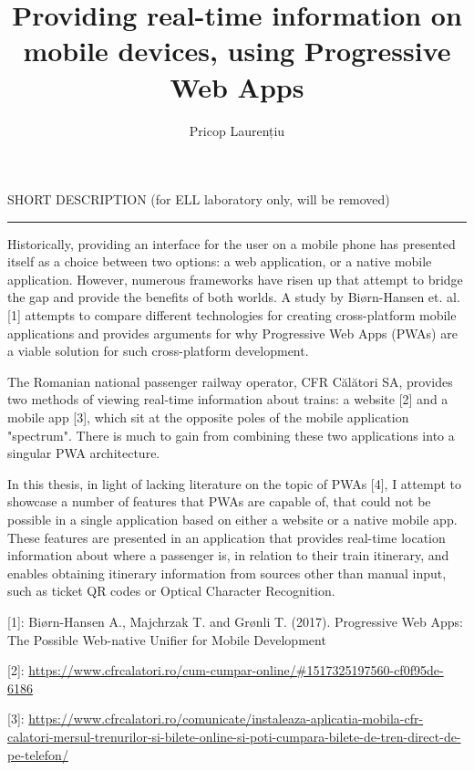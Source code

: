 \documentclass[12pt]{report}
\begin{document}
\title{Providing real-time information on mobile devices, using Progressive Web Apps}
\author{Pricop Laurențiu}
				
\maketitle

\cleardoublepage
SHORT DESCRIPTION (for ELL laboratory only, will be removed)
\vspace{0.5cm}
\hrule
\vspace{0.5cm}

Historically, providing an interface for the user on a mobile phone has presented itself as a choice between two options: a web application, or a native mobile application. However, numerous frameworks have risen up that attempt to bridge the gap and provide the benefits of both worlds. A study by Biørn-Hansen et. al. [1] attempts to compare different technologies for creating cross-platform mobile applications and provides arguments for why Progressive Web Apps (PWAs) are a viable solution for such cross-platform development.

The Romanian national passenger railway operator, CFR Călători SA, provides two methods of viewing real-time information about trains: a website [2] and a mobile app [3], which sit at the opposite poles of the mobile application "spectrum". There is much to gain from combining these two applications into a singular PWA architecture.

In this thesis, in light of lacking literature on the topic of PWAs [4], I attempt to showcase a number of features that PWAs are capable of, that could not be possible in a single application based on either a website or a native mobile app. These features are presented in an application that provides real-time location information about where a passenger is, in relation to their train itinerary, and enables obtaining itinerary information from sources other than manual input, such as ticket QR codes or Optical Character Recognition.

[1]: Biørn-Hansen A., Majchrzak T. and Grønli T. (2017). Progressive Web Apps: The Possible Web-native Unifier for Mobile Development

[2]: \url{https://www.cfrcalatori.ro/cum-cumpar-online/#1517325197560-cf0f95de-6186}

[3]: \url{https://www.cfrcalatori.ro/comunicate/instaleaza-aplicatia-mobila-cfr-calatori-mersul-trenurilor-si-bilete-online-si-poti-cumpara-bilete-de-tren-direct-de-pe-telefon/}
\end{document}
